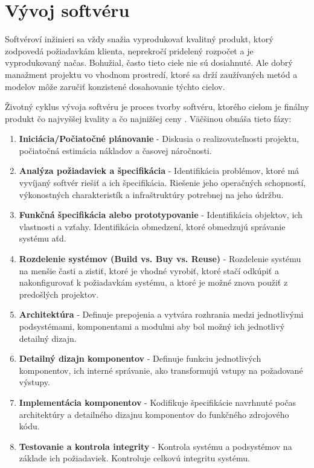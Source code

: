 \documentclass[10pt,twoside,slovak,a4paper]{article}
\begin{document}
\section{Vývoj softvéru} \label{vyvojSoftveru}

Softvéroví inžinieri sa vždy snažia vyprodukovať kvalitný produkt, ktorý zodpovedá požiadavkám klienta, neprekročí pridelený rozpočet a je vyprodukovaný načas. Bohužial, často tieto ciele nie sú dosiahnuté. Ale dobrý manažment projektu vo vhodnom prostredí, ktoré sa drží zaužívaných metód a modelov môže zaručiť konzistené dosahovanie týchto cielov. \cite{Methodologies}

Životný cyklus vývoja softvéru je proces tvorby softvéru, ktorého cielom je finálny produkt čo najvyššej kvality a čo najnižšej ceny \cite{SDLCdef}. Väčšinou obnáša tieto fázy:\cite{SDCLphases}
\begin{enumerate}
\item \textbf{Iniciácia/Počiatočné plánovanie} - Diskusia o realizovateľnosti projektu, počiatočná estimácia nákladov a časovej náročnosti.
\item \textbf{Analýza požiadaviek a špecifikácia} - Identifikácia problémov, ktoré má vyvíjaný softvér riešiť a ich špecifikácia. Riešenie jeho operačných schopností, výkonostných charakteristík a infraštruktúry potrebnej na jeho údržbu.
\item \textbf{Funkčná špecifikácia alebo prototypovanie} - Identifikácia objektov, ich vlastnosti a vzťahy. Identifikácia obmedzení, ktoré obmedzujú správanie systému aťd. 
\item \textbf{Rozdelenie systémov (Build vs. Buy vs. Reuse)} - Rozdelenie systému na menšie časti a zistiť, ktoré je vhodné vyrobiť, ktoré stačí odkúpiť a nakonfigurovať k požiadavkám systému, a ktoré je možné znova použiť z predošlých projektov.
\item \textbf{Architektúra} - Definuje prepojenia a vytvára rozhrania medzi jednotlivými podsystémami, komponentami a modulmi aby bol možný ich jednotlivý detailný dizajn.
\item \textbf{Detailný dizajn komponentov} - Definuje funkciu jednotlivých komponentov, ich interné správanie, ako transformujú vstupy na požadované výstupy.
\item \textbf{Implementácia komponentov} - Kodifikuje špecifikácie navrhnuté počas architektúry a detailného dizajnu komponentov do funkčného zdrojového kódu.
\item \textbf{Testovanie a kontrola integrity} - Kontrola systému a podsystémov na základe ich požiadaviek. Kontroluje celkovú integritu systému.

\end{enumerate}
\end{document}
